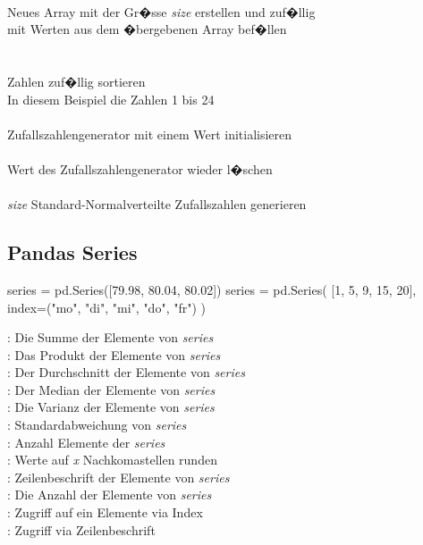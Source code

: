 \documentclass{article}
\begin{document}
\begin{multicols*}{3}
 \\
Neues Array mit der Gr�sse \textit{size} erstellen und zuf�llig \\
mit Werten aus dem �bergebenen Array bef�llen \\

 \\
 \\
Zahlen zuf�llig sortieren \\
In diesem Beispiel die Zahlen 1 bis 24 \\

 \\
Zufallszahlengenerator mit einem Wert initialisieren \\

 \\
Wert des Zufallszahlengenerator wieder l�schen \\

 \\
\textit{size} Standard-Normalverteilte Zufallszahlen generieren

\subsection*{Pandas Series}
\begin{python}
series = pd.Series([79.98, 80.04, 80.02])
series = pd.Series(
  [1, 5, 9, 15, 20],
  index=("mo", "di", "mi", "do", "fr")
)
\end{python}

: Die Summe der Elemente von \textit{series} \\
: Das Produkt der Elemente von \textit{series} \\
: Der Durchschnitt der Elemente von \textit{series} \\
: Der Median der Elemente von \textit{series} \\
: Die Varianz der Elemente von \textit{series} \\
: Standardabweichung von \textit{series} \\
: Anzahl Elemente der \textit{series} \\
: Werte auf \textit{x} Nachkomastellen runden \\
: Zeilenbeschrift der Elemente von \textit{series} \\
: Die Anzahl der Elemente von \textit{series} \\
: Zugriff auf ein Elemente via Index \\
: Zugriff via Zeilenbeschrift


\end{multicols*}
\end{document}
